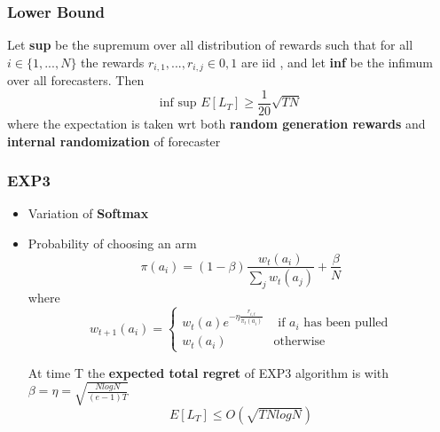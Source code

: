 \documentclass[12pt]{article} %
\begin{document}
\subsubsection{Lower Bound}
Let \textbf{sup} be the supremum over all distribution of rewards such that for all $i \in \{ 1,...,N\}$ the rewards $r_{i,1}, ...,r_{i,j} \in 0,1$ are iid , and let \textbf{inf} be the infimum over all forecasters. Then
$$ \text{inf sup }E[L_T]\geq \frac{1}{20} \sqrt{TN}$$
where the expectation is taken wrt both \textbf{random generation rewards} and \textbf{internal randomization} of forecaster

\subsubsection{EXP3}
\begin{itemize}
\item Variation of \textbf{Softmax}
\item Probability of choosing an arm 
$$ \pi(a_i)= (1-\beta)\frac{w_t(a_i)}{\sum _j w_t(a_j)} +\frac{\beta}{N}$$
where
 $$ w_{t+1}(a_i) = \begin{cases} 
 w_t(a)e^{- \eta  \frac{r_{i,t}}{\pi_t(a_i)}} & \text{ if } a_i \text{ has been pulled}\\
 w_t(a_i) & \text{otherwise}  
\end{cases} 
  $$
  
 At time T the \textbf{expected total regret} of EXP3 algorithm is with $\beta=\eta = \sqrt{\frac{N log N }{(e-1)T}}$ 
 $$ E[L_T] \leq O(\sqrt{TN log N})$$
\end{itemize}
\end{document}
